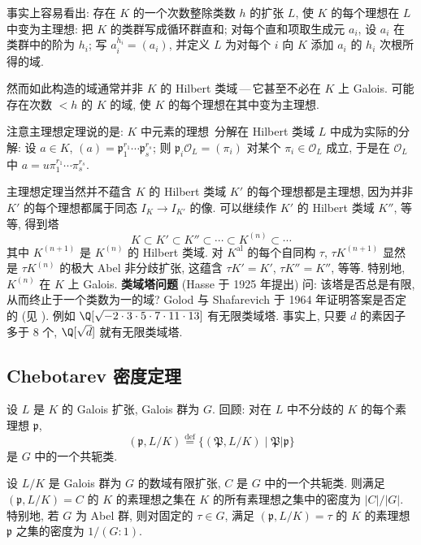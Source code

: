 \begin{remark}\label{rem:v.3.20}
事实上容易看出: 存在 $K$ 的一个次数整除类数 $h$ 的扩张 $L$, 使 $K$ 的每个理想在 $L$ 中变为主理想: 把 $K$ 的类群写成循环群直和; 对每个直和项取生成元 $a_i$, 设 $a_i$ 在类群中的阶为 $h_i$; 写 $a_i^{h_i}=(a_i)$, 并定义 $L$ 为对每个 $i$ 向 $K$ 添加 $a_i$ 的 $h_i$ 次根所得的域.

然而如此构造的域通常并非 $K$ 的 Hilbert 类域\,---\,它甚至不必在 $K$ 上 Galois. 可能存在次数 $<h$ 的 $K$ 的域, 使 $K$ 的每个理想在其中变为主理想.
\end{remark}

\begin{remark}\label{rem:v.3.21}
注意主理想定理说的是: $K$ 中元素的\guillemotleft 理想\guillemotright\ 分解在 Hilbert 类域 $L$ 中成为实际的分解: 设 $a\in K$, $(a)=\mathfrak{p}_1^{r_1}\cdots\mathfrak{p}_s^{r_s}$; 则 $\mathfrak{p}_i\mathcal{O}_L=(\pi_i)$ 对某个 $\pi_i\in\mathcal{O}_L$ 成立, 于是在 $\mathcal{O}_L$ 中 $a=u\pi_1^{r_1}\cdots\pi_s^{r_s}$.
\end{remark}

\begin{remark}\label{rem:v.3.22}
主理想定理当然并不蕴含 $K$ 的 Hilbert 类域 $K'$ 的每个理想都是主理想, 因为并非 $K'$ 的每个理想都属于同态 $I_K\to I_{K'}$ 的像. 可以继续作 $K'$ 的 Hilbert 类域 $K''$, 等等, 得到塔
\[
K\subset K'\subset K''\subset\cdots\subset K^{(n)}\subset\cdots
\]
其中 $K^{(n+1)}$ 是 $K^{(n)}$ 的 Hilbert 类域. 对 $K^{\mathrm{al}}$ 的每个自同构 $\tau$, $\tau K^{(n+1)}$ 显然是 $\tau K^{(n)}$ 的极大 Abel 非分歧扩张, 这蕴含 $\tau K'=K'$, $\tau K''=K''$, 等等. 特别地, $K^{(n)}$ 在 $K$ 上 Galois. \textbf{类域塔问题} (Hasse 于 1925 年提出) 问: 该塔是否总是有限, 从而终止于一个类数为一的域? Golod 与 Shafarevich 于 1964 年证明答案是否定的 (见 \cite{Roquette1967}). 例如 $\Q[\sqrt{-2\cdot 3\cdot 5\cdot 7\cdot 11\cdot 13}]$ 有无限类域塔. 事实上, 只要 $d$ 的素因子多于 $8$ 个, $\Q[\sqrt{d}]$ 就有无限类域塔.
\end{remark}

\subsection*{Chebotarev 密度定理}

设 $L$ 是 $K$ 的 Galois 扩张, Galois 群为 $G$. 回顾: 对在 $L$ 中不分歧的 $K$ 的每个素理想 $\mathfrak{p}$,
\[
(\mathfrak{p},L/K)\overset{\mathrm{def}}{=}\{(\mathfrak{P},L/K)\mid\mathfrak{P}|\mathfrak{p}\}
\]
是 $G$ 中的一个共轭类.

\begin{theorem}\label{thm:v.3.23}
设 $L/K$ 是 Galois 群为 $G$ 的数域有限扩张, $C$ 是 $G$ 中的一个共轭类. 则满足 $(\mathfrak{p},L/K)=C$ 的 $K$ 的素理想之集在 $K$ 的所有素理想之集中的密度为 $|C|/|G|$. 特别地, 若 $G$ 为 Abel 群, 则对固定的 $\tau\in G$, 满足 $(\mathfrak{p},L/K)=\tau$ 的 $K$ 的素理想 $\mathfrak{p}$ 之集的密度为 $1/(G:1)$.
\end{theorem}

